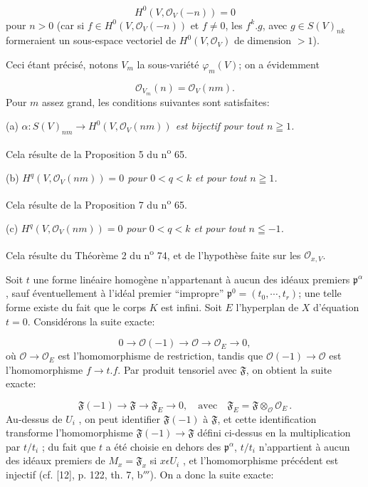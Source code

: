\begin{equation*}
H^0(V, \mathcal{O}_V(-n)) = 0
\end{equation*}
pour $n > 0$ (car si $f \in H^0(V, \mathcal{O}_V(-n))$ et $f \neq 0$, les $f^k.g$, avec $g \in S(V)_{nk}$ formeraient un sous-espace vectoriel de $H^0(V, \mathcal{O}_V)$ de dimension $>1$).

Ceci étant précisé, notons $V_m$ la sous-variété $\varphi_m(V)$; on a évidemment

\begin{equation*}
\mathcal{O}_{V_m}(n) = \mathcal{O}_V(nm).
\end{equation*}
Pour $m$ assez grand, les conditions suivantes sont satisfaites:

(a) \textit{$\alpha : S(V)_{nm} \to H^0(V, \mathcal{O}_V(nm))$ est bijectif pour tout $n \geqq 1$.}

Cela résulte de la Proposition 5 du n\textsuperscript{o} 65.

(b) \textit{$H^q(V, \mathcal{O}_V(nm)) = 0$ pour $0 < q < k$ et pour tout $n \geqq 1$.}

Cela résulte de la Proposition 7 du n\textsuperscript{o} 65.

(c) \textit{$H^q(V, \mathcal{O}_V(nm)) = 0$ pour $0 < q < k$ et pour tout $n \leqq -1$.}

Cela résulte du Théorème 2 du n\textsuperscript{o} 74, et de l'hypothèse faite sur les $\mathcal{O}_{x,V}$.



Soit $t$ une forme linéaire homogène n'appartenant à aucun des idéaux premiers $\mathfrak{p}^\alpha$, sauf éventuellement à l'idéal premier ``impropre'' $\mathfrak{p}^0 = (t_0 , \cdots , t_r)$; une telle forme existe du fait que le corps $K$ est infini. Soit $E$ l'hyperplan de $X$ d'équation $t = 0$. Considérons la suite exacte:

\begin{equation*}
0 \to \mathcal{O}(-1) \to \mathcal{O} \to \mathcal{O}_E \to 0,
\end{equation*}
où $\mathcal{O} \to \mathcal{O}_E$ est l'homomorphisme de restriction, tandis que $\mathcal{O}(-1) \to \mathcal{O}$ est l'homomorphisme $f \to t.f$. Par produit tensoriel avec $\mathfrak{F}$, on obtient la suite exacte:

\begin{equation*}
\mathfrak{F}(-1) \to \mathfrak{F} \to \mathfrak{F}_E \to 0, \quad \mathrm{avec} \quad \mathfrak{F}_E = \mathfrak{F} \otimes_{\mathcal{O}} \mathcal{O}_E \, .
\end{equation*}
Au-dessus de $U_i$ , on peut identifier $\mathfrak{F}(-1)$ à $\mathfrak{F}$, et cette identification transforme l'homomorphisme $\mathfrak{F}(-1) \to \mathfrak{F}$ défini ci-dessus en la multiplication par $t/t_i$ ; du fait que $t$ a été choisie en dehors des $\mathfrak{p}^\alpha$, $t/t_i$ n'appartient à aucun des idéaux premiers de $M_x = \mathfrak{F}_x$ si $x \epsilon U_i$ , et l'homomorphisme précédent est injectif (cf. [12], p. 122, th. 7, b$'''$). On a donc la suite exacte:

